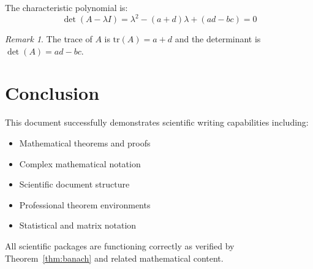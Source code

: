 \documentclass{article}
\theoremstyle{definition}
\theoremstyle{remark}
\newtheorem{remark}{Remark}[section]
\begin{document}
The characteristic polynomial is:
\[
\det(A - \lambda I) = \lambda^2 - (a+d)\lambda + (ad-bc) = 0
\]

\begin{remark}
The trace of $A$ is $\text{tr}(A) = a + d$ and the determinant is $\det(A) = ad - bc$.
\end{remark}

\section{Conclusion}
This document successfully demonstrates scientific writing capabilities including:
\begin{itemize}
    \item Mathematical theorems and proofs
    \item Complex mathematical notation
    \item Scientific document structure
    \item Professional theorem environments
    \item Statistical and matrix notation
\end{itemize}

All scientific packages are functioning correctly as verified by Theorem~\ref{thm:banach} and related mathematical content.
\end{document}
